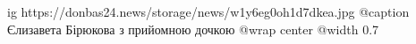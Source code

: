  
 
 
 
 

\ifcmt
  ig https://donbas24.news/storage/news/w1y6eg0oh1d7dkea.jpg
	@caption Єлизавета Бірюкова з прийомною дочкою
  @wrap center
  @width 0.7
\fi
